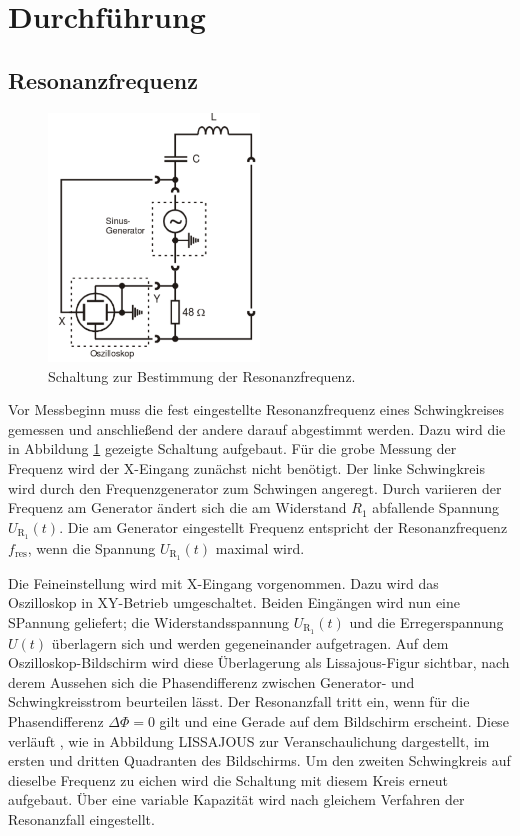 \section{Durchführung}
\label{sec:Durchfuehrung}
\subsection{Resonanzfrequenz}
\label{sec:Resonanzfrequenz}


\begin{figure}[h]
	\centering
		\includegraphics[width=0.5\textwidth]{Bilder/Resonanzfrequenz.pdf}
		\caption{Schaltung zur Bestimmung der Resonanzfrequenz.}
\label{fig:resonanzfrequenz}
\end{figure}
Vor Messbeginn muss die fest eingestellte Resonanzfrequenz eines Schwingkreises gemessen und anschließend der andere darauf abgestimmt werden. Dazu wird die in Abbildung \ref{fig:resonanzfrequenz} gezeigte Schaltung aufgebaut. Für die grobe Messung der Frequenz wird der X-Eingang zunächst nicht benötigt. Der linke Schwingkreis wird durch den Frequenzgenerator zum Schwingen angeregt. Durch variieren der Frequenz am Generator ändert sich die am Widerstand $R_1$ abfallende Spannung $U_\mathup{R_1}(t)$. Die am Generator eingestellt Frequenz entspricht der Resonanzfrequenz $f_\mathup{res}$, wenn die Spannung $U_\mathup{R_1}(t)$ maximal wird.

Die Feineinstellung wird mit X-Eingang vorgenommen.
Dazu wird das Oszilloskop in XY-Betrieb umgeschaltet. Beiden Eingängen wird nun eine SPannung geliefert; die Widerstandsspannung $U_\mathup{R_1}(t)$ und die Erregerspannung $U(t)$ überlagern sich und werden gegeneinander aufgetragen. Auf dem Oszilloskop-Bildschirm wird diese Überlagerung als Lissajous-Figur sichtbar, nach derem Aussehen sich die Phasendifferenz zwischen Generator- und Schwingkreisstrom beurteilen lässt. 
Der Resonanzfall tritt ein, wenn für die Phasendifferenz $\Delta{\Phi}=0$  gilt und eine Gerade auf dem Bildschirm erscheint. Diese verläuft , wie in Abbildung LISSAJOUS zur Veranschaulichung dargestellt, im ersten und dritten Quadranten des Bildschirms.
Um den zweiten Schwingkreis auf dieselbe Frequenz zu eichen wird die Schaltung mit diesem Kreis erneut aufgebaut. Über eine variable Kapazität wird nach gleichem Verfahren der Resonanzfall eingestellt.

